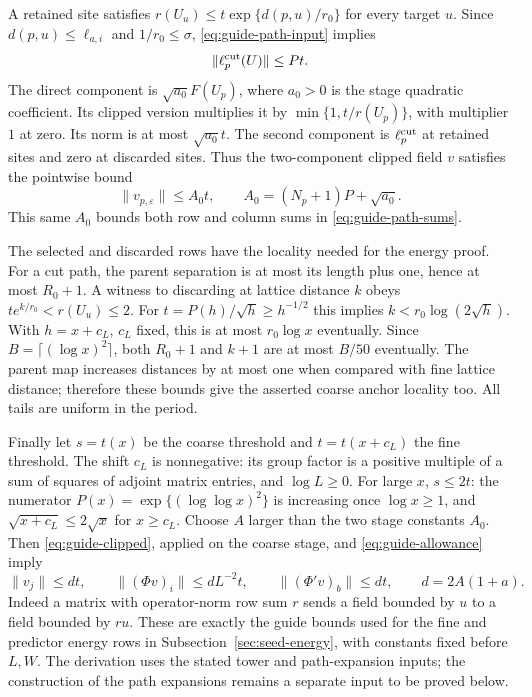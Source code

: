 A retained site satisfies
$r(U_u)\le t\exp\{d(p,u)/r_0\}$ for every target $u$. Since
$d(p,u)\le\ell_{a,i}$ and $1/r_0\le\sigma$,
\eqref{eq:guide-path-input} implies
\begin{equation}\label{eq:guide-kept}
 \|\ell_p^{\rm cut}(U)\|\le Pt.
\end{equation}
The direct component is $\sqrt{a_0}F(U_p)$, where $a_0>0$ is the
stage quadratic coefficient. Its clipped version multiplies it by
$\min\{1,t/r(U_p)\}$, with multiplier $1$ at zero. Its norm is at
most $\sqrt{a_0}t$. The second component is
$\ell_p^{\rm cut}$ at retained sites and zero at discarded sites.
Thus the two-component clipped field $v$ satisfies the pointwise
bound
\begin{equation}\label{eq:guide-clipped}
 \|v_{p,\varepsilon}\|\le A_0t,
 \qquad A_0=(N_p+1)P+\sqrt{a_0}.
\end{equation}
This same $A_0$ bounds both row and column sums in
\eqref{eq:guide-path-sums}.

The selected and discarded rows have the locality needed for the
energy proof. For a cut path, the parent separation is at most its
length plus one, hence at most $R_0+1$. A witness to discarding at
lattice distance $k$ obeys $t e^{k/r_0}<r(U_u)\le2$. For
$t=P(h)/\sqrt h\ge h^{-1/2}$ this implies
$k<r_0\log(2\sqrt h)$. With $h=x+c_L$, $c_L$ fixed, this is at most
$r_0\log x$ eventually. Since $B=\lceil(\log x)^2\rceil$, both
$R_0+1$ and $k+1$ are at most $B/50$ eventually. The parent map
increases distances by at most one when compared with fine lattice
distance; therefore these bounds give the asserted coarse anchor
locality too. All tails are uniform in the period.

Finally let $s=t(x)$ be the coarse threshold and $t=t(x+c_L)$ the
fine threshold. The shift $c_L$ is nonnegative: its group factor is
a positive multiple of a sum of squares of adjoint matrix entries,
and $\log L\ge0$. For large $x$, $s\le2t$: the numerator
$P(x)=\exp\{(\log\log x)^2\}$ is increasing once $\log x\ge1$,
and $\sqrt{x+c_L}\le2\sqrt x$ for $x\ge c_L$.
Choose $A$ larger than the two stage constants $A_0$. Then
\eqref{eq:guide-clipped}, applied on the coarse stage, and
\eqref{eq:guide-allowance} imply
\begin{equation}\label{eq:guide-maximum}
 \|v_j\|\le dt,\qquad
 \|(\Phi v)_i\|\le dL^{-2}t,\qquad
 \|(\Phi'v)_b\|\le dt,
 \qquad d=2A(1+a).
\end{equation}
Indeed a matrix with operator-norm row sum $r$ sends a field bounded
by $u$ to a field bounded by $ru$. These are exactly the guide bounds
used for the fine and predictor energy rows in
Subsection~\ref{sec:seed-energy}, with constants fixed before $L,W$.
The derivation uses the stated tower and path-expansion inputs; the
construction of the path expansions remains a separate input to be
proved below.
